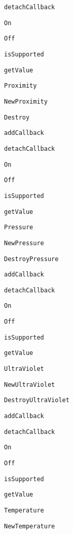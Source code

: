 \begin{DoxyItemize}
\begin{DoxyItemize}
\item {\tt detach\-Callback}
\item {\tt On}
\item {\tt Off}
\item {\tt is\-Supported}
\item {\tt get\-Value}
\end{DoxyItemize}
\item {\tt Proximity}
\begin{DoxyItemize}
\item {\tt New\-Proximity}
\item {\tt Destroy}
\item {\tt add\-Callback}
\item {\tt detach\-Callback}
\item {\tt On}
\item {\tt Off}
\item {\tt is\-Supported}
\item {\tt get\-Value}
\end{DoxyItemize}
\item {\tt Pressure}
\begin{DoxyItemize}
\item {\tt New\-Pressure}
\item {\tt Destroy\-Pressure}
\item {\tt add\-Callback}
\item {\tt detach\-Callback}
\item {\tt On}
\item {\tt Off}
\item {\tt is\-Supported}
\item {\tt get\-Value}
\end{DoxyItemize}
\item {\tt Ultra\-Violet}
\begin{DoxyItemize}
\item {\tt New\-Ultra\-Violet}
\item {\tt Destroy\-Ultra\-Violet}
\item {\tt add\-Callback}
\item {\tt detach\-Callback}
\item {\tt On}
\item {\tt Off}
\item {\tt is\-Supported}
\item {\tt get\-Value}
\end{DoxyItemize}
\item {\tt Temperature}
\begin{DoxyItemize}
\item {\tt New\-Temperature}

\end{DoxyItemize}
\end{DoxyItemize}
